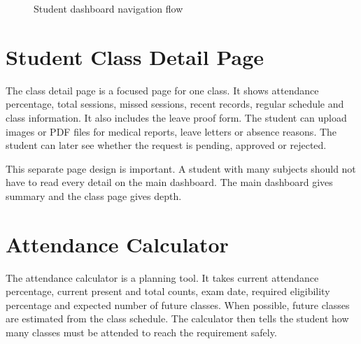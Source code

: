 \begin{figure}[H]
\centering
{}
\caption{Student dashboard navigation flow}
\label{fig:student-dashboard-flow}
\end{figure}

\section{Student Class Detail Page}

The class detail page is a focused page for one class. It shows attendance percentage, total sessions, missed sessions, recent records, regular schedule and class information. It also includes the leave proof form. The student can upload images or PDF files for medical reports, leave letters or absence reasons. The student can later see whether the request is pending, approved or rejected.

This separate page design is important. A student with many subjects should not have to read every detail on the main dashboard. The main dashboard gives summary and the class page gives depth.

\section{Attendance Calculator}

The attendance calculator is a planning tool. It takes current attendance percentage, current present and total counts, exam date, required eligibility percentage and expected number of future classes. When possible, future classes are estimated from the class schedule. The calculator then tells the student how many classes must be attended to reach the requirement safely.

